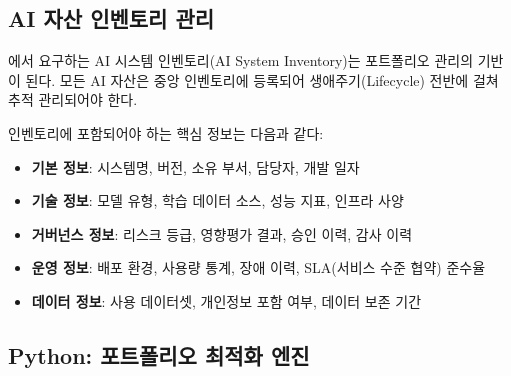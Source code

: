 \subsection{AI 자산 인벤토리 관리}
\label{sec:8.5.5}

\cite{iso42001}에서 요구하는 AI 시스템 인벤토리(AI System Inventory)는 포트폴리오 관리의 기반이 된다. 모든 AI 자산은 중앙 인벤토리에 등록되어 생애주기(Lifecycle) 전반에 걸쳐 추적 관리되어야 한다.

인벤토리에 포함되어야 하는 핵심 정보는 다음과 같다:

\begin{itemize}
    \item \textbf{기본 정보}: 시스템명, 버전, 소유 부서, 담당자, 개발 일자
    \item \textbf{기술 정보}: 모델 유형, 학습 데이터 소스, 성능 지표, 인프라 사양
    \item \textbf{거버넌스 정보}: 리스크 등급, 영향평가 결과, 승인 이력, 감사 이력
    \item \textbf{운영 정보}: 배포 환경, 사용량 통계, 장애 이력, SLA(서비스 수준 협약) 준수율
    \item \textbf{데이터 정보}: 사용 데이터셋, 개인정보 포함 여부, 데이터 보존 기간
\end{itemize}

\subsection{Python: 포트폴리오 최적화 엔진}
\label{sec:8.5.6}

